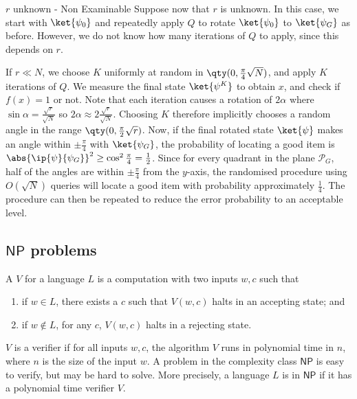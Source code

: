 \begin{aside}{$r$ unknown - Non Examinable}
    Suppose now that $r$ is unknown.
    In this case, we start with $\ket{\psi_0}$ and repeatedly apply $Q$ to rotate $\ket{\psi_0}$ to $\ket{\psi_G}$ as before.
    However, we do not know how many iterations of $Q$ to apply, since this depends on $r$.

    If $r \ll N$, we choose $K$ uniformly at random in $\qty(0, \frac{\pi}{4}\sqrt{N})$, and apply $K$ iterations of $Q$.
    We measure the final state $\ket{\psi^K}$ to obtain $x$, and check if $f(x) = 1$ or not.
    Note that each iteration causes a rotation of $2\alpha$ where $\sin \alpha = \frac{\sqrt{r}}{\sqrt{N}}$ so $2\alpha \approx 2\frac{\sqrt{r}}{\sqrt{N}}$.
    Choosing $K$ therefore implicitly chooses a random angle in the range $\qty(0, \frac{\pi}{2} \sqrt{r})$.
    Now, if the final rotated state $\ket{\psi}$ makes an angle within $\pm \frac{\pi}{4}$ with $\ket{\psi_G}$, the probability of locating a good item is $\abs{\ip{\psi}{\psi_G}}^2 \geq \cos^2 \frac{\pi}{4} = \frac{1}{2}$.
    Since for every quadrant in the plane $\mathcal P_G$, half of the angles are within $\pm \frac{\pi}{4}$ from the $y$-axis, the randomised procedure using $O(\sqrt{N})$ queries will locate a good item with probability approximately $\frac{1}{4}$.
    The procedure can then be repeated to reduce the error probability to an acceptable level.
\end{aside}

\subsection{\texorpdfstring{$\mathsf{NP}$}{NP} problems}
A  $V$ for a language $L$ is a computation with two inputs $w, c$ such that
\begin{enumerate}
    \item if $w \in L$, there exists a  $c$ such that $V(w,c)$ halts in an accepting state; and
    \item if $w \not\in L$, for any $c$, $V(w,c)$ halts in a rejecting state.
\end{enumerate}
$V$ is a  verifier if for all inputs $w, c$, the algorithm $V$ runs in polynomial time in $n$, where $n$ is the size of the input $w$.
A problem in the  complexity class $\mathsf{NP}$ is easy to verify, but may be hard to solve.
More precisely, a language $L$ is in $\mathsf{NP}$ if it has a polynomial time verifier $V$.

